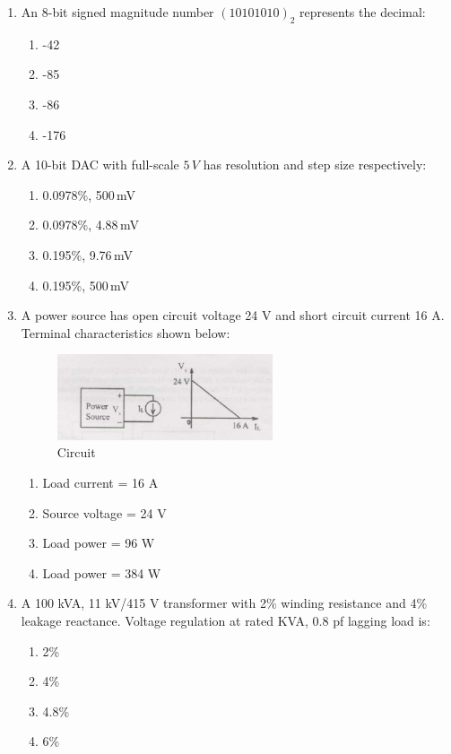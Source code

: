 \documentclass[journal,cmex10]{IEEEtran}
\theoremstyle{remark}
\numberwithin{equation}{enumi}
\numberwithin{figure}{enumi}
\begin{document}
\begin{enumerate}[label=\arabic*)]
    \item An 8-bit signed magnitude number $(10101010)_2$ represents the decimal:
    \bigskip
    \hfill {}
    \begin{enumerate}[label=\alph*)]
        \item -42
        \item -85
        \item -86
        \item -176
    \end{enumerate}
    \bigskip

    \item A 10-bit DAC with full-scale $5\,V$ has resolution and step size respectively:
    \bigskip
    \hfill {}
    \begin{enumerate}[label=\alph*)]
        \item 0.0978\%, 500\,mV
        \item 0.0978\%, 4.88\,mV
        \item 0.195\%, 9.76\,mV
        \item 0.195\%, 500\,mV
    \end{enumerate}
    \bigskip

    \item A power source has open circuit voltage 24 V and short circuit current 16 A. Terminal characteristics shown below:
    \begin{figure}[htbp]
  \centering
  \includegraphics[width=0.6\textwidth]{figs/C/fig3.png}
  \caption{Circuit}
  \label{C/fig3}
\end{figure}
    \bigskip
    \hfill {}
    \begin{enumerate}[label=\alph*)]
        \item Load current = 16 A
        \item Source voltage = 24 V
        \item Load power = 96 W
        \item Load power = 384 W
    \end{enumerate}
    \bigskip

    \item A 100 kVA, 11 kV/415 V transformer with 2\% winding resistance and 4\% leakage reactance. Voltage regulation at rated KVA, 0.8 pf lagging load is:
    \bigskip
    \hfill {}
    \begin{enumerate}[label=\alph*)]
        \item 2\%
        \item 4\%
        \item 4.8\%
        \item 6\%
    \end{enumerate}
    \bigskip


\end{enumerate}
\end{document}

